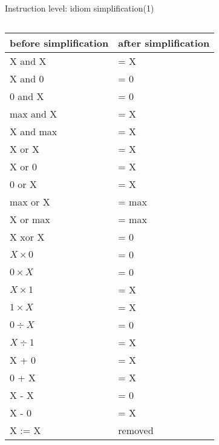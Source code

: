 \begin{frame}{Instruction level: idiom simplification(1)}
     \begin{columns}[t]
     \begin{column}[T]{3.7cm}
     \begin{tiny}
     \begin{tabular}{|l|l|}
     \hline
     before simplification & after simplification \bigstrut \\
     \hline 
     \hline
       X and X   & = X \\
       X and 0   & = 0 \\
       0 and X   & = 0 \\
       max and X & = X \\
       X and max & = X \\
     \hline
       X or X   & = X \\ 
       X or 0   & = X \\
       0 or X   & = X \\
       max or X & = max \\
       X or max & = max \\
     \hline 
       X xor X   & = 0 \\
     \hline
       $X \times 0$ & = 0 \\
       $0 \times X$ & = 0 \\
       $X \times 1$ & = X \\
       $1 \times X$ & = X \\ 
     \hline
       $0 \div X$ & = 0 \\
       $X \div 1$ & = X \\ 
     \hline
       X + 0     & = X \\
       0 + X     & = X \\
     \hline
       X - X     & = 0 \\
       X - 0     & = X \\
     \hline
       X := X & removed \\
     \hline
     \end{tabular}
     \end{tiny}
     \end{column}


\end{columns}
\end{frame}
